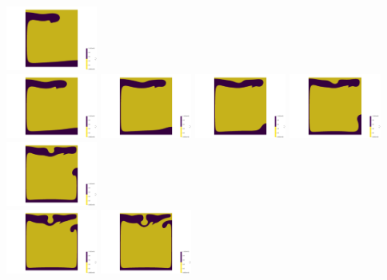 \begin{itemize}
\begin{center}
\includegraphics[width=3cm]{images/benchmark_vaks97/aspect/lvl7/composition_threshold0004}\\
\includegraphics[width=3cm]{images/benchmark_vaks97/aspect/lvl7/composition_threshold0005}
\includegraphics[width=3cm]{images/benchmark_vaks97/aspect/lvl7/composition_threshold0006}
\includegraphics[width=3cm]{images/benchmark_vaks97/aspect/lvl7/composition_threshold0007}
\includegraphics[width=3cm]{images/benchmark_vaks97/aspect/lvl7/composition_threshold0008}
\includegraphics[width=3cm]{images/benchmark_vaks97/aspect/lvl7/composition_threshold0009}\\
\includegraphics[width=3cm]{images/benchmark_vaks97/aspect/lvl7/composition_threshold0010}
\includegraphics[width=3cm]{images/benchmark_vaks97/aspect/lvl7/composition_threshold0011}

\end{center}
\end{itemize}
